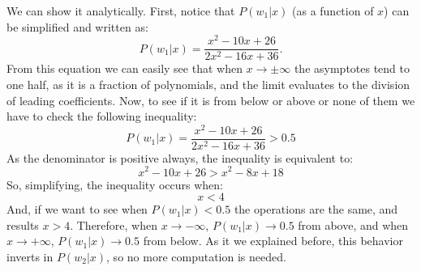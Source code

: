 \documentclass[10pt]{article}
\begin{document}
\begin{enumerate}
We can show it analytically. First, notice that $P(w_1|x)$ (as a function of $x$) can be simplified and written as:
$$
P(w_1|x) = \frac{x^2 - 10x + 26}{2x^2-16x+36}.
$$
From this equation we can easily see that when $x \rightarrow \pm\infty$ the asymptotes tend to one half, as it is a fraction of polynomials, and the limit evaluates to the division of leading coefficients. Now, to see if it is from below or above or none of them we have to check the following inequality:
$$
P(w_1|x) =\frac{x^2 - 10x + 26}{2x^2-16x+36}>0.5
$$
As the denominator is positive always, the inequality is equivalent to:
$$
x^2 - 10x + 26 > x^2-8x+18
$$
So, simplifying, the inequality occurs when:
$$
x < 4
$$
And, if we want to see when $P(w_1|x) < 0.5$ the operations are the same, and results $ x > 4$. Therefore, when $x \rightarrow -\infty$,
$P(w_1|x)\rightarrow 0.5$ from above, and when $x \rightarrow +\infty$, $P(w_1|x) \rightarrow 0.5$ from below. As it we explained before, this behavior inverts in $P(w_2|x)$, so no more computation is needed.


\end{enumerate}
\end{document}
